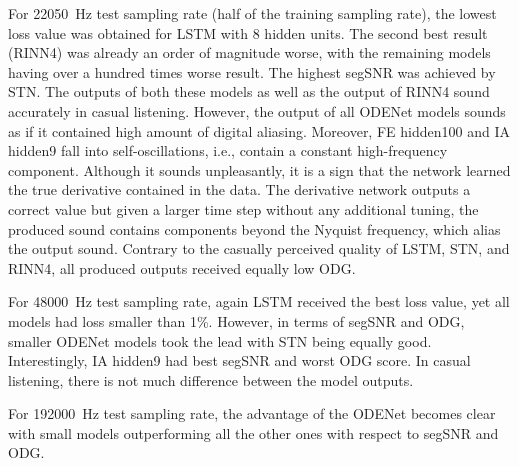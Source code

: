 For \SI{22050}{Hz} test sampling rate (half of the training sampling rate), the lowest loss value was obtained for \ac{LSTM} with 8 hidden units. The second best result (\ac{RINN}4) was already an order of magnitude worse, with the remaining models having over a hundred times worse result. The highest \ac{segSNR} was achieved by \ac{STN}. The outputs of both these models as well as the output of \ac{RINN}4 sound accurately in casual listening. However, the output of all ODENet models sounds as if it contained high amount of digital aliasing. Moreover, FE hidden100 and IA hidden9 fall into self-oscillations, i.e., contain a constant high-frequency component. Although it sounds unpleasantly, it is a sign that the network learned the true derivative contained in the data. The derivative network outputs a correct value but given a larger time step without any additional tuning, the produced sound contains components beyond the Nyquist frequency, which alias the output sound. Contrary to the casually perceived quality of \ac{LSTM}, \ac{STN}, and \ac{RINN}4, all produced outputs received equally low \ac{ODG}. 

For \SI{48000}{Hz} test sampling rate, again \ac{LSTM} received the best loss value, yet all models had loss smaller than 1\%. However, in terms of \ac{segSNR} and \ac{ODG}, smaller ODENet models took the lead with \ac{STN} being equally good. Interestingly, IA hidden9 had best \ac{segSNR} and worst \ac{ODG} score. In casual listening, there is not much difference between the model outputs.

For \SI{192000}{Hz} test sampling rate, the advantage of the ODENet becomes clear with small models outperforming all the other ones with respect to \ac{segSNR} and \ac{ODG}. 
